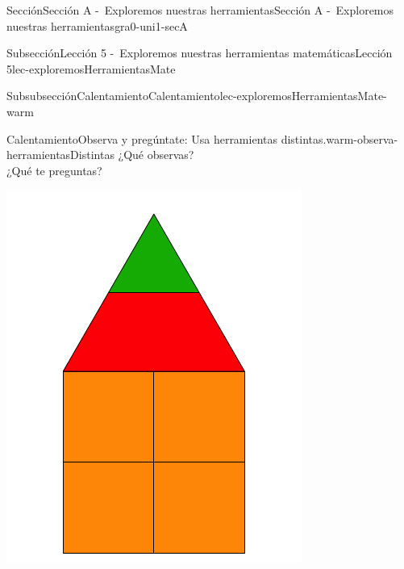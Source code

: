 \documentclass[twoside,10pt,]{article}
\begin{document}
\begin{sectionptx}{Sección}{Sección A -~Exploremos nuestras herramientas}{}{Sección A -~Exploremos nuestras herramientas}{}{}{gra0-uni1-secA}
\begin{subsectionptx}{Subsección}{Lección 5 -~Exploremos nuestras herramientas matemáticas}{}{Lección 5}{}{}{lec-exploremosHerramientasMate}
%
%
\typeout{************************************************}
\typeout{************************************************}
%
\begin{subsubsectionptx}{Subsubsección}{Calentamiento}{}{Calentamiento}{}{}{lec-exploremosHerramientasMate-warm}
\begin{exploration}{Calentamiento}{Observa y pregúntate: Usa herramientas distintas.}{warm-observa-herramientasDistintas}%
¿Qué observas?\\
 ¿Qué te preguntas?%
\begin{sidebyside}{2}{0.05}{0.05}{0.1}%
\begin{sbspanel}{0.4}%
\includegraphics[width=\linewidth]{external/svg-source/tikz-file-148145.pdf}
\end{sbspanel}%
\begin{sbspanel}{0.4}%

\end{sbspanel}
\end{sidebyside}
\end{exploration}
\end{subsubsectionptx}
\end{subsectionptx}
\end{sectionptx}
\end{document}

